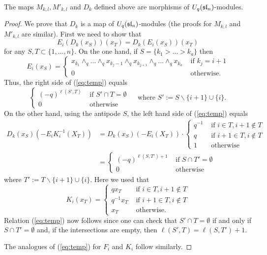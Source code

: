 \documentclass[11pt]{amsart}
\begin{document}
\begin{lem}\label{lem:slnmaps}
The maps $M_{k,l}, M'_{k,l}$ and $D_k$ defined above are morphisms of $U_q(\sl_n)$-modules. 
\end{lem}
\begin{proof}
We prove that $D_k$ is a map of $U_q(\sl_n)$-modules (the proofs for $M_{k,l}$ and $M'_{k,l}$ are similar). First we need to show that 
\begin{equation}\label{eq:temp}
E_i(D_k(x_S))(x_T) = D_k(E_i(x_S))(x_T)
\end{equation}
for any $S,T \subset \{1,\dots,n\}$. On the one hand, if $S = \{k_1 > \dots > k_a\}$ then 
$$E_i(x_S) = \begin{cases} x_{k_1} \wedge_q \dots \wedge_q x_{k_j-1} \wedge_q x_{k_{j+1}} \wedge_q \dots \wedge_q x_{k_a} & \text{ if } k_j = i+1 \\ 0 & \text{ otherwise. } \end{cases}$$
Thus, the right side of (\ref{eq:temp}) equals 
$$\begin{cases} (-q)^{\ell(S',T)} & \text{ if } S' \cap T = \emptyset \\ 0 & \text{ otherwise } \end{cases} \ \ \ \ \text{ where } S' := S \smallsetminus \{ i+1 \} \cup \{ i \}.$$
On the other hand, using the antipode $S$, the left hand side of (\ref{eq:temp}) equals
\begin{align*}
D_k(x_S) (- E_iK_i^{-1}(X_T)) 
&= D_k(x_S) (-E_i(X_T)) \cdot \begin{cases} q^{-1} & \text{ if } i \in T, i+1 \not\in T \\ q & \text{ if } i+1 \in T, i \not\in T \\ 1 & \text{ otherwise } \end{cases} \\
&= \begin{cases} (-q)^{\ell(S,T')+1} & \text{ if } S \cap T' = \emptyset \\ 0 & \text{ otherwise } \end{cases}
\end{align*}
where $T' := T \smallsetminus \{i+1\} \cup \{ i \}$. Here we used that 
$$K_i(x_T) = \begin{cases} q x_T & \text{ if } i \in T, i+1 \not\in T \\ q^{-1} x_T & \text{ if } i+1 \in T, i \not\in T \\ x_T & \text{ otherwise. } \end{cases}$$
Relation (\ref{eq:temp}) now follows since one can check that $S' \cap T = \emptyset$ if and only if $S \cap T' = \emptyset$ and, if the intersections are empty, then $\ell(S',T) = \ell(S,T')+1$. 

The analogues of (\ref{eq:temp}) for $F_i$ and $K_i$ follow similarly. 
\end{proof}
\end{document}
